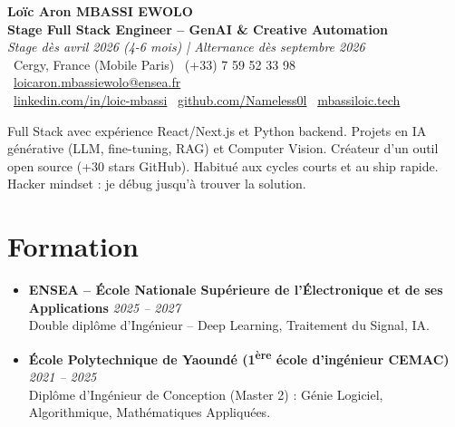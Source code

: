 \documentclass[a4paper,11pt]{article}
\begin{document}
\begin{center}
    {\Large \textbf{Loïc Aron MBASSI EWOLO}} \\ \vspace{4pt}
    \textbf{\large Stage Full Stack Engineer -- GenAI \& Creative Automation} \\
    \textit{\small Stage dès avril 2026 (4-6 mois) | Alternance dès septembre 2026} \\ \vspace{4pt}
    \small
    \faMapMarker\ Cergy, France (Mobile Paris) \quad
    \faPhone\ (+33) 7 59 52 33 98 \quad
    {\color{primary}\faEnvelope\ \href{mailto:loicaron.mbassiewolo@ensea.fr}{loicaron.mbassiewolo@ensea.fr}} \\ \vspace{2pt}
    {\color{primary}\faLinkedin\ \href{https://www.linkedin.com/in/loic-mbassi/}{linkedin.com/in/loic-mbassi}} \quad
    {\color{primary}\faGithub\ \href{https://github.com/Nameless0l}{github.com/Nameless0l}} \quad
    {\color{primary}\faGlobe\ \href{https://mbassiloic.tech}{mbassiloic.tech}}
\end{center}

\vspace{-6pt}

\noindent\small{Full Stack avec expérience React/Next.js et Python backend. Projets en IA générative (LLM, fine-tuning, RAG) et Computer Vision. Créateur d'un outil open source (+30 stars GitHub). Habitué aux cycles courts et au ship rapide. Hacker mindset : je débug jusqu'à trouver la solution.}

\section{Formation}
\begin{itemize}[leftmargin=*, label=\tiny$\bullet$, nosep]
    \item \textbf{ENSEA -- École Nationale Supérieure de l'Électronique et de ses Applications} \hfill \textit{2025 -- 2027} \\
    \small{Double diplôme d'Ingénieur -- Deep Learning, Traitement du Signal, IA.}
    \item \textbf{École Polytechnique de Yaoundé (1\textsuperscript{ère} école d'ingénieur CEMAC)} \hfill \textit{2021 -- 2025} \\
    \small{Diplôme d'Ingénieur de Conception (Master 2) : Génie Logiciel, Algorithmique, Mathématiques Appliquées.}
\end{itemize}
\end{document}
